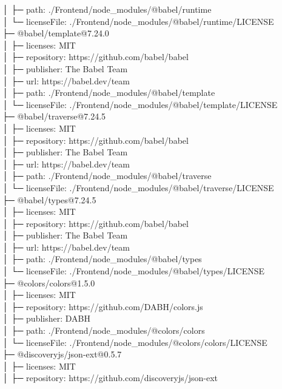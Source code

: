 │  ├─ path: ./Frontend/node\_modules/@babel/runtime\\
│  └─ licenseFile: ./Frontend/node\_modules/@babel/runtime/LICENSE\\
├─ @babel/template@7.24.0\\
│  ├─ licenses: MIT\\
│  ├─ repository: https://github.com/babel/babel\\
│  ├─ publisher: The Babel Team\\
│  ├─ url: https://babel.dev/team\\
│  ├─ path: ./Frontend/node\_modules/@babel/template\\
│  └─ licenseFile: ./Frontend/node\_modules/@babel/template/LICENSE\\
├─ @babel/traverse@7.24.5\\
│  ├─ licenses: MIT\\
│  ├─ repository: https://github.com/babel/babel\\
│  ├─ publisher: The Babel Team\\
│  ├─ url: https://babel.dev/team\\
│  ├─ path: ./Frontend/node\_modules/@babel/traverse\\
│  └─ licenseFile: ./Frontend/node\_modules/@babel/traverse/LICENSE\\
├─ @babel/types@7.24.5\\
│  ├─ licenses: MIT\\
│  ├─ repository: https://github.com/babel/babel\\
│  ├─ publisher: The Babel Team\\
│  ├─ url: https://babel.dev/team\\
│  ├─ path: ./Frontend/node\_modules/@babel/types\\
│  └─ licenseFile: ./Frontend/node\_modules/@babel/types/LICENSE\\
├─ @colors/colors@1.5.0\\
│  ├─ licenses: MIT\\
│  ├─ repository: https://github.com/DABH/colors.js\\
│  ├─ publisher: DABH\\
│  ├─ path: ./Frontend/node\_modules/@colors/colors\\
│  └─ licenseFile: ./Frontend/node\_modules/@colors/colors/LICENSE\\
├─ @discoveryjs/json-ext@0.5.7\\
│  ├─ licenses: MIT\\
│  ├─ repository: https://github.com/discoveryjs/json-ext\\
